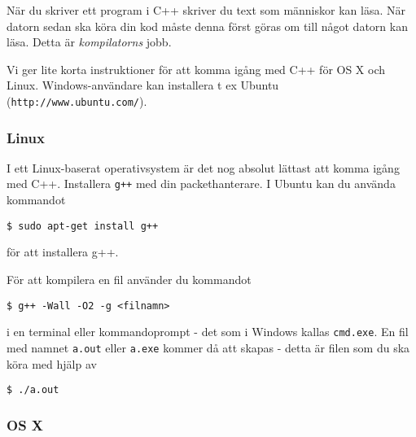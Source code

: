 När du skriver ett program i C++ skriver du text som människor kan läsa. När datorn sedan ska köra din kod måste denna först göras om till något datorn kan läsa. Detta är \emph{kompilatorns} jobb.

Vi ger lite korta instruktioner för att komma igång med C++ för OS X och Linux. Windows-användare kan installera t ex Ubuntu (\texttt{http://www.ubuntu.com/}).

\subsubsection{Linux}
I ett Linux-baserat operativsystem är det nog absolut lättast att komma igång med C++. Installera \texttt{g++} med din packethanterare. I Ubuntu kan du använda kommandot

\texttt{\$ sudo apt-get install g++}

för att installera g++.

För att kompilera en fil använder du kommandot

\texttt{\$ g++ -Wall -O2 -g <filnamn>}

i en terminal eller kommandoprompt - det som i Windows kallas \texttt{cmd.exe}. En fil med namnet \texttt{a.out} eller \texttt{a.exe} kommer då att skapas - detta är filen som du ska köra med hjälp av

\texttt{\$ ./a.out}


\subsubsection{OS X}

